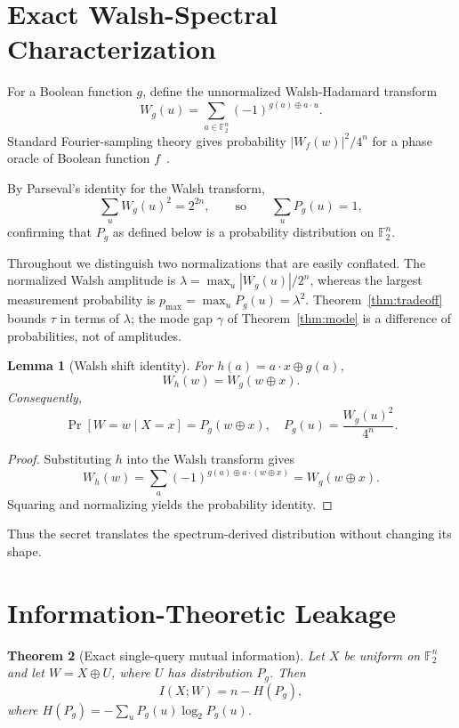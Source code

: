 \documentclass[10pt,twocolumn]{article}
\newtheorem{theorem}{Theorem}
\newtheorem{lemma}[theorem]{Lemma}
\theoremstyle{definition}
\begin{document}
\section{Exact Walsh-Spectral Characterization}

For a Boolean function $g$, define the unnormalized Walsh-Hadamard transform
\[ W_g(u) = \sum_{a \in \mathbb{F}_2^n} (-1)^{g(a) \oplus a \cdot u}. \]
Standard Fourier-sampling theory gives probability $|W_f(w)|^2/4^n$ for a phase oracle of Boolean function $f$~\cite{floess2013,hillery2011}.

By Parseval's identity for the Walsh transform,
\[ \sum_{u} W_g(u)^2 = 2^{2n}, \qquad \text{so} \qquad \sum_u P_g(u) = 1, \]
confirming that $P_g$ as defined below is a probability distribution on
$\mathbb{F}_2^n$.

Throughout we distinguish two normalizations that are easily conflated. The
normalized Walsh amplitude is $\lambda = \max_u |W_g(u)|/2^n$, whereas the
largest measurement probability is $p_{\max} = \max_u P_g(u) = \lambda^2$.
Theorem~\ref{thm:tradeoff} bounds $\tau$ in terms of $\lambda$; the mode gap
$\gamma$ of Theorem~\ref{thm:mode} is a difference of probabilities, not of
amplitudes.

\begin{lemma}[Walsh shift identity]\label{lem:shift}
For $h(a) = a \cdot x \oplus g(a)$,
\[ W_h(w) = W_g(w \oplus x). \]
Consequently,
\[ \Pr[W = w \mid X = x] = P_g(w \oplus x), \quad P_g(u) = \frac{W_g(u)^2}{4^n}. \]
\end{lemma}

\begin{proof}
Substituting $h$ into the Walsh transform gives
\[ W_h(w) = \sum_a (-1)^{g(a) \oplus a \cdot (w \oplus x)} = W_g(w \oplus x). \]
Squaring and normalizing yields the probability identity.
\end{proof}

Thus the secret translates the spectrum-derived distribution without changing its shape.

\section{Information-Theoretic Leakage}

\begin{theorem}[Exact single-query mutual information]\label{thm:mi}
Let $X$ be uniform on $\mathbb{F}_2^n$ and let $W = X \oplus U$, where $U$ has distribution $P_g$. Then
\[ I(X;W) = n - H(P_g), \]
where $H(P_g) = -\sum_u P_g(u)\log_2 P_g(u)$.
\end{theorem}
\end{document}
